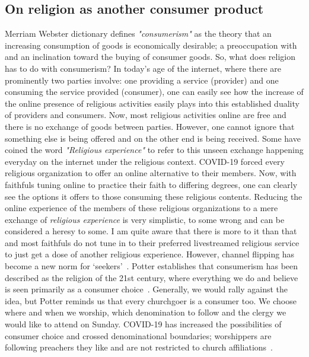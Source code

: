\subsection{On religion as another consumer product}
Merriam Webster dictionary defines \textit{"consumerism"} as the theory that an increasing consumption of goods is economically desirable; a preoccupation with and an inclination toward the buying of consumer goods. So, what does religion has to do with consumerism? In today's age of the internet, where there are prominently two parties involve: one providing a service (provider) and one consuming the service provided (consumer), one can easily see how the increase of the online presence of religious activities easily plays into this established duality of providers and consumers. Now, most religious activities online are free and there is no exchange of goods between parties. However, one cannot ignore that something else is being offered and on the other end is being received. Some have coined the word \textit{"Religious experience"} to refer to this unseen exchange happening everyday on the internet under the religious context. COVID-19 forced every religious organization to offer an online alternative to their members. Now, with faithfuls tuning online to practice their faith to differing degrees, one can clearly see the options it offers to those consuming these religious contents. Reducing the online experience of the members of these religious organizations to a mere exchange of \textit{religious experience} is very simplistic, to some wrong and can be considered a heresy to some. I am quite aware that there is more to it than that and most faithfuls do not tune in to their preferred livestreamed religious service to just get a dose of another religious experience. However, channel flipping has become a new norm for ‘seekers’~\cite{jerry:pillay}. Potter establishes that consumerism has been described as the religion of the 21st century, where everything we do and believe is seen primarily as a consumer choice~\cite{jerry:pillay}. Generally, we would rally against the idea, but Potter reminds us that every churchgoer is a consumer too. We choose where and when we worship, which denomination to follow and the clergy we would like to attend on Sunday. COVID-19 has increased the possibilities of consumer choice and crossed denominational boundaries; worshippers are following preachers they like and are not restricted to church affiliations~\cite{jerry:pillay}.

